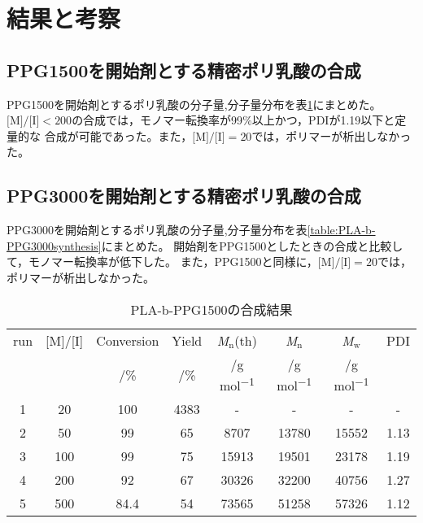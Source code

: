 \section{結果と考察}
\subsection{PPG1500を開始剤とする精密ポリ乳酸の合成}
PPG1500を開始剤とするポリ乳酸の分子量,分子量分布を表\ref{table:PLA-b-PPG1500synthesis}にまとめた。
$\textrm{[M]/[I]} < 200$の合成では，モノマー転換率が99$\%$以上かつ，PDIが1.19以下と定量的な
合成が可能であった。また，$\textrm{[M]/[I]} = 20$では，ポリマーが析出しなかった。
\subsection{PPG3000を開始剤とする精密ポリ乳酸の合成}
PPG3000を開始剤とするポリ乳酸の分子量,分子量分布を表\ref{table:PLA-b-PPG3000synthesis}にまとめた。
開始剤をPPG1500としたときの合成と比較して，モノマー転換率が低下した。
また，PPG1500と同様に，$\textrm{[M]/[I]} = 20$では，ポリマーが析出しなかった。
\begin{table}[h]
    \caption{PLA-b-PPG1500の合成結果}
    \label{table:PLA-b-PPG1500synthesis}
    \centering
      \begin{tabular}{cccccccc}
        \hline
        run &  [M]/[I] & Conversion & Yield & \textit{M}${}_\textrm{n}$(th) & \textit{M}${}_\textrm{n}$ & \textit{M}${}_\textrm{w}$ & PDI\\
        &   & /\% & /\% & /\si{\g} \si{mol^{-1}} & /\si{\g} \si{mol^{-1}} & /\si{\g} \si{mol^{-1}} & \\
        \hline\hline
        1 & 20 & 100 & 4383 & - & - & - & - \\
        2 & 50 & 99 & 65 & 8707 & 13780 & 15552 & 1.13 \\
        3 & 100 & 99 & 75 & 15913 & 19501 & 23178 & 1.19\\
        4 & 200 & 92 & 67& 30326 & 32200 & 40756 & 1.27\\
        5 & 500 & 84.4 & 54 & 73565 & 51258 & 57326 & 1.12\\
        \hline
      \end{tabular}
\end{table}


